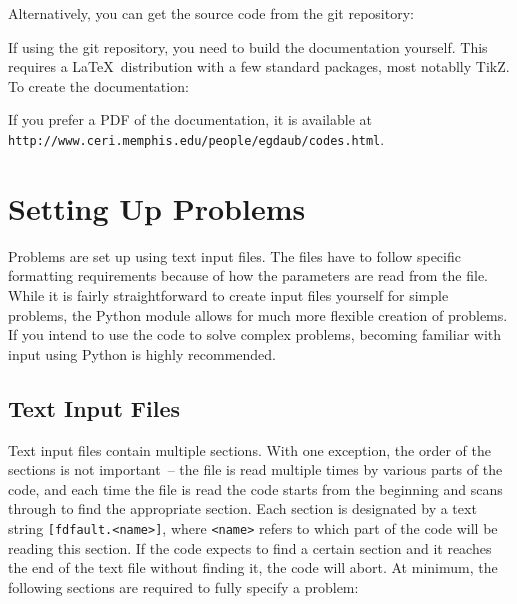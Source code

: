 \documentclass[12pt]{article}   	%
\begin{document}
Alternatively, you can get the source code from the git repository:

\vspace{0.1in}

\vspace{0.1in}
If using the git repository, you need to build the documentation yourself. This requires a \LaTeX\ distribution with a few standard packages, most notablly TikZ. To create the documentation:

\vspace{0.1in}

\vspace{0.1in}
\noindent If you prefer a PDF of the documentation, it is available at \\
{\tt http://www.ceri.memphis.edu/people/egdaub/codes.html}.

\section{Setting Up Problems}

Problems are set up using text input files. The files have to follow specific formatting requirements because of how the parameters are read from the file. While it is fairly straightforward to create input files yourself for simple problems, the Python module allows for much more flexible creation of problems. If you intend to use the code to solve complex problems, becoming familiar with input using Python is highly recommended.

\subsection{Text Input Files}

Text input files contain multiple sections. With one exception, the order of the sections is not important~-- the file is read multiple times by various parts of the code, and each time the file is read the code starts from the beginning and scans through to find the appropriate section. Each section is designated by a text string {\tt [fdfault.<name>]}, where {\tt <name>} refers to which part of the code will be reading this section. If the code expects to find a certain section and it reaches the end of the text file without finding it, the code will abort. At minimum, the following sections are required to fully specify a problem:
\end{document}
